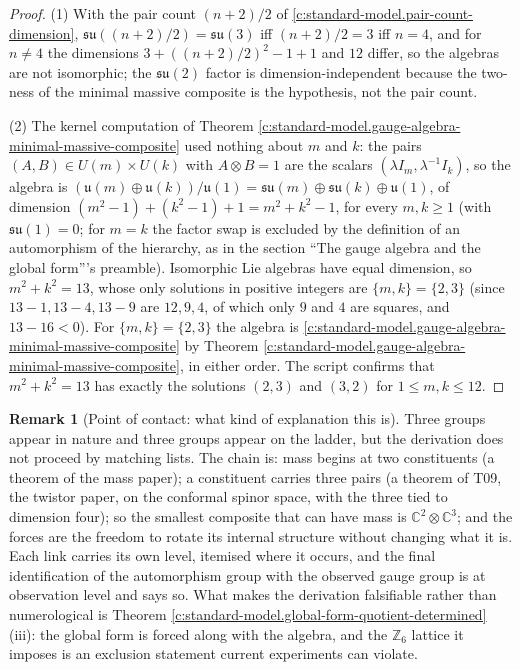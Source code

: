 \documentclass[11pt]{article}
\theoremstyle{definition}
\newtheorem{remark}[theorem]{Remark}
\theoremstyle{plain}
\newcommand{\changedmark}[2]{\marginpar{\raggedright\scriptsize\color{#1}#2}}
\providecommand{\C}{}\renewcommand{\C}{\mathbb{C}}
\providecommand{\su}{}\renewcommand{\su}{\mathfrak{su}}
\providecommand{\uu}{}\renewcommand{\uu}{\mathfrak{u}}
\begin{document}
\begin{proof}
(1) With the pair count $(n+2)/2$ of \ref{c:standard-model.pair-count-dimension}, $\su((n+2)/2) = \su(3)$ iff $(n+2)/2 = 3$ iff $n = 4$, and for $n \neq 4$ the dimensions $3 + ((n+2)/2)^{2} - 1 + 1$ and $12$ differ, so the algebras are not isomorphic; the $\su(2)$ factor is dimension-independent because the two-ness of the minimal massive composite is the hypothesis, not the pair count.

(2) The kernel computation of Theorem \ref{c:standard-model.gauge-algebra-minimal-massive-composite} used nothing about $m$ and $k$: the pairs $(A, B) \in U(m) \times U(k)$ with $A \otimes B = 1$ are the scalars $(\lambda I_{m}, \lambda^{-1}I_{k})$, so the algebra is $(\uu(m) \oplus \uu(k))/\uu(1) = \su(m) \oplus \su(k) \oplus \uu(1)$, of dimension $(m^{2} - 1) + (k^{2} - 1) + 1 = m^{2} + k^{2} - 1$, for every $m, k \ge 1$ (with $\su(1) = 0$; for $m = k$ the factor swap is excluded by the definition of an automorphism of the hierarchy, as in the section ``The gauge algebra and the global form'''s preamble). Isomorphic Lie algebras have equal dimension, so $m^{2} + k^{2} = 13$, whose only solutions in positive integers are $\{m, k\} = \{2, 3\}$ (since $13 - 1, 13 - 4, 13 - 9$ are $12, 9, 4$, of which only $9$ and $4$ are squares, and $13 - 16 < 0$). For $\{m, k\} = \{2, 3\}$ the algebra is \ref{c:standard-model.gauge-algebra-minimal-massive-composite} by Theorem \ref{c:standard-model.gauge-algebra-minimal-massive-composite}, in either order. The script confirms that $m^{2} + k^{2} = 13$ has exactly the solutions $(2, 3)$ and $(3, 2)$ for $1 \le m, k \le 12$.

\end{proof}

\begin{remark}[Point of contact: what kind of explanation this is]\label{c:note.standard-model.point-contact-what-kind-explanation}
\changedmark{gray}{reworded}
Three groups appear in nature and three groups appear on the ladder, but the derivation does not proceed by matching lists. The chain is: mass begins at two constituents (a theorem of the mass paper); a constituent carries three pairs (a theorem of T09, the twistor paper, on the conformal spinor space, with the three tied to dimension four); so the smallest composite that can have mass is $\C^{2} \otimes \C^{3}$; and the forces are the freedom to rotate its internal structure without changing what it is. Each link carries its own level, itemised where it occurs, and the final identification of the automorphism group with the observed gauge group is at observation level and says so. What makes the derivation falsifiable rather than numerological is Theorem \ref{c:standard-model.global-form-quotient-determined}(iii): the global form is forced along with the algebra, and the $\mathbb{Z}_{6}$ lattice it imposes is an exclusion statement current experiments can violate.
\end{remark}
\end{document}
